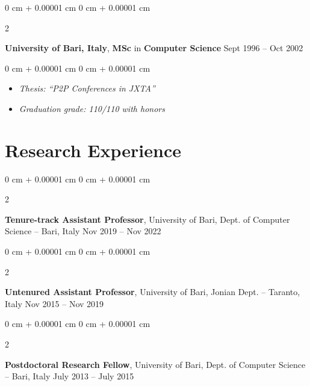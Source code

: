 \documentclass[10pt, a4paper]{article}
\newenvironment{highlights}{
    \begin{itemize}[
        topsep=0.10 cm,
        parsep=0.10 cm,
        partopsep=0pt,
        itemsep=0pt,
        leftmargin=0 cm + 10pt
    ]
}{
    \end{itemize}
} %
\newenvironment{onecolentry}{
    \begin{adjustwidth}{
        0 cm + 0.00001 cm
    }{
        0 cm + 0.00001 cm
    }
}{
    \end{adjustwidth}
} %
\newenvironment{twocolentry}[2][]{
    \onecolentry
    \def\secondColumn{#2}
    \setcolumnwidth{\fill, 4.5 cm}
    \begin{paracol}{2}
}{
    \switchcolumn \raggedleft \secondColumn
    \end{paracol}
    \endonecolentry
} %
\begin{document}
        \vspace{0.2 cm}

        \begin{twocolentry}{
            Sept 1996 – Oct 2002
        }
            \textbf{University of Bari, Italy}, \textbf{MSc} in \textbf{Computer Science}\end{twocolentry}

        \vspace{0.10 cm}
        \begin{onecolentry}
            \begin{highlights}
                \item \textit{Thesis: ``P2P Conferences in JXTA''}
                \item \textit{Graduation grade: 110/110 with honors}
            \end{highlights}
        \end{onecolentry}



    
    \section{Research Experience}



        
        \begin{twocolentry}{
            Nov 2019 – Nov 2022
        }
            \textbf{Tenure-track Assistant Professor}, University of Bari, Dept. of Computer Science -- Bari, Italy\end{twocolentry}



        \vspace{0.2 cm}

        \begin{twocolentry}{
            Nov 2015 – Nov 2019
        }
            \textbf{Untenured Assistant Professor}, University of Bari, Jonian Dept. -- Taranto, Italy\end{twocolentry}



        \vspace{0.2 cm}

        \begin{twocolentry}{
            July 2013 – July 2015
        }
            \textbf{Postdoctoral Research Fellow}, University of Bari, Dept. of Computer Science -- Bari, Italy\end{twocolentry}
\end{document}
